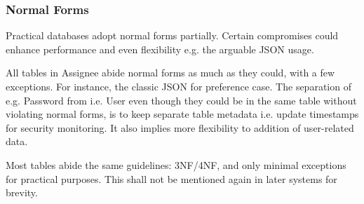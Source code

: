\subsubsection{Normal Forms}
\label{data-layer.design.user.normals}

Practical databases adopt normal forms partially. Certain compromises could
enhance performance and even flexibility e.g. the arguable JSON usage.

All tables in Assignee abide normal forms as much as they could, with a few
exceptions. For instance, the classic JSON for preference case. The separation of
e.g. Password from i.e. User even though they could be in the same table without
violating normal forms, is to keep separate table metadata i.e. update timestamps
for security monitoring. It also implies more flexibility to addition of user-related
data.

Most tables abide the same guidelines: 3NF/4NF, and only minimal exceptions for
practical purposes. This shall not be mentioned again in later systems for brevity.